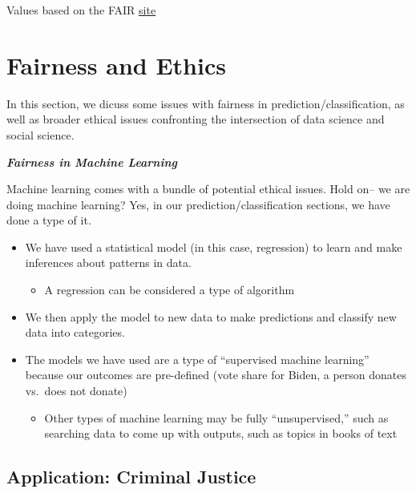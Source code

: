 \documentclass[
  letterpaper,
  DIV=11,
  numbers=noendperiod]{scrreprt}
\providecommand{\tightlist}{%
  \setlength{\itemsep}{0pt}\setlength{\parskip}{0pt}}\usepackage{longtable,booktabs,array}
\begin{document}
Values based on the FAIR
\href{https://fairmodel.econ.yale.edu/vote2020/computev.htm}{site}


\hypertarget{fairness}{%
\chapter{Fairness and Ethics}\label{fairness}}

In this section, we dicuss some issues with fairness in
prediction/classification, as well as broader ethical issues confronting
the intersection of data science and social science.

\textbf{\emph{Fairness in Machine Learning}}

Machine learning comes with a bundle of potential ethical issues. Hold
on-- we are doing machine learning? Yes, in our
prediction/classification sections, we have done a type of it.

\begin{itemize}
\tightlist
\item
  We have used a statistical model (in this case, regression) to learn
  and make inferences about patterns in data.

  \begin{itemize}
  \tightlist
  \item
    A regression can be considered a type of algorithm
  \end{itemize}
\item
  We then apply the model to new data to make predictions and classify
  new data into categories.
\item
  The models we have used are a type of ``supervised machine learning''
  because our outcomes are pre-defined (vote share for Biden, a person
  donates vs.~does not donate)

  \begin{itemize}
  \tightlist
  \item
    Other types of machine learning may be fully ``unsupervised,'' such
    as searching data to come up with outputs, such as topics in books
    of text
  \end{itemize}
\end{itemize}

\hypertarget{application-criminal-justice}{%
\section{Application: Criminal
Justice}\label{application-criminal-justice}}
\end{document}
